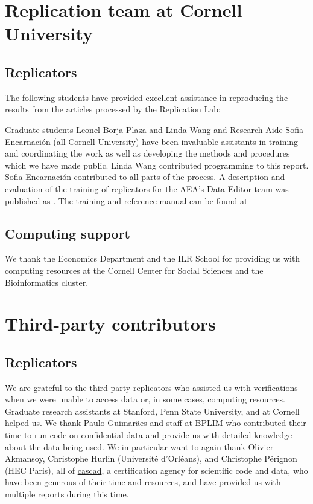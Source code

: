 
\section{Replication team at Cornell University}

\subsection{Replicators} 
\label{app:replicators}

The following \textbf{\teamsize} students have provided excellent assistance in reproducing the results from the \jiramcs{} articles processed by the Replication Lab:
%
%
%

%
Graduate students  Leonel Borja Plaza and Linda Wang and Research Aide Sofia Encarnación (all Cornell University) have been invaluable assistants in training and coordinating the work as well as developing the methods and procedures which we have made public.  Linda Wang contributed programming to this report. Sofia Encarnación contributed to all parts of the process. A description and evaluation of the training of replicators for the AEA's Data Editor team was published as \citet{vilhuber_teaching_2022}. The training and reference manual can be found at 

\subsection{Computing support}

We thank the Economics Department and the ILR School for providing us with computing resources at the Cornell Center for Social Sciences and the Bioinformatics cluster. 

\section{Third-party contributors}

\subsection{Replicators}
\label{app:3rdparty}

We are grateful to the  third-party replicators who assisted us with verifications when we were unable to access data or, in some cases, computing resources. 
%
Graduate research assistants at Stanford, Penn State University, and at Cornell helped us. We thank  Paulo Guimarães and staff at \ac{BPLIM} who contributed their  time to  run code  on confidential data and provide us with detailed knowledge about the data being used. We in particular want to again thank Olivier Akmansoy, Christophe Hurlin (Université d'Orléans), and Christophe Pérignon (HEC Paris), all of \href{https://cascad.tech}{cascad}, a certification agency for scientific code and data, who have been generous of their time and resources, and have provided us with multiple reports during this time.  

